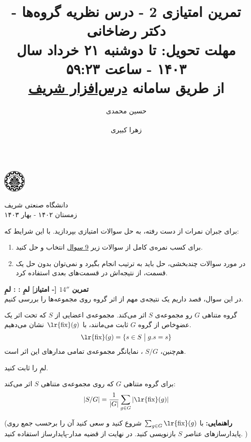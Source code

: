 \documentclass{article}
\title{
	\vspace{-0.8em}
	تمرین امتیازی 2 - درس نظریه گروه‌ها - دکتر رضاخانی
	\\
	{\normalsize
		\textbf{مهلت تحویل:
			تا دوشنبه ۲۱ خرداد سال ۱۴۰۳ - ساعت ۵۹:۲۳
			\\
			\vspace{-0.4em}
			از طریق سامانه
			\href{https://cw.sharif.edu/}{درس‌افزار شریف}
		}
	}
	\vspace{-0.6em}
}
\author{
	حسین محمدی\\
	\lr{
		\href{mailto:hossein.mohammadi.00427@gmail.com}{\texttt{	hossein.mohammadi.00427@gmail.com}}} \\
	\And
	زهرا کبیری\\
	\lr{
		\href{mailto:kabiri.zahra98@gmail.com}{ \texttt{kabiri.zahra98@gmail.com}}}\\
}
\newenvironment{parind}{%
	\par%
	\leftskip=0mm\rightskip=7mm
	\noindent\ignorespaces}{%
	\par}
\newenvironment{exercise}[3][\unskip]{%
	\par
	\noindent
	\textbf{تمرین
		#1
		[- امتیاز] 
		\def\temp{#3}\ifx\temp\empty
		: 
		\else
		: #3 \vspace{0.5em} \\ \noindent
		\fi
}}{}
\begin{document}
	
	
	\begin{minipage}{0.1\textwidth}%
		\includegraphics[width=1.1cm]{sharif-logo.png}
	\end{minipage}%
	\hfill%
	\begin{minipage}{0.9\textwidth}\raggedleft
		دانشگاه صنعتی شریف\\
		زمستان ۱۴۰۲ - بهار ۱۴۰۳\\
	\end{minipage}
	
	\makepertitle
	
	\noindent
	برای جبران نمرات از دست رفته، به حل سوالات امتیازی بپردازید. با این شرایط که:
	\begin{enumerate}
		\item برای کسب نمره‌ی کامل از سوالات زیر \underline{9 سوال}  انتخاب و حل کنید. 
		\item در مورد سوالات چندبخشی، حل باید به ترتیب انجام بگیرد و نمی‌توان بدون حل یک قسمت، از نتیجه‌اش در قسمت‌های بعدی استفاده کرد. 
		
	\end{enumerate}
	
	
	\begin{exercise}[$14''$]{20}{لمِ
		}
		در این سوال، قصد داریم یک نتیجه‌ی مهم از اثر گروه روی مجموعه‌ها  را بررسی کنیم.
		\begin{mdframed}
			گروه متناهی $G$ رو مجموعه‌ی 
			$S$
			اثر می‌کند. مجموعه‌ی اعضایی از $S$ که تحت اثر یک عضوِخاص از گروه $G$ ثابت می‌مانند، با 
			$\text{\lr{fix}}(g)$
			نشان می‌دهیم.
			\[
			\text{\lr{fix}}(g) = \{s\in S \; \big| \; g.s=s\}
			\]
			هم‌چنین، 
			$S/G$
			، نمایانگر مجموعه‌ی تمامی مدارهای این اثر است.
		\end{mdframed}
		لمِ 
		را ثابت کنید.
		\begin{parind}
			برای گروه متناهی $G$ که روی مجموعه‌ی متناهی $S$ اثر می‌کند:
			\[
			|S/G| = \frac{1}{|G|} \sum_{g\in G}|\text{\lr{fix}}(g)|
			\]
		\end{parind}
		
		\noindent
		(\textbf{راهنمایی:}
		با 
		$\sum_{g\in G} \text{\lr{fix}}(g)$
		شروع کنید و سعی کنید آن را برحسب جمع روی پایدارسازهای عناصر 
		$S$ بازنویسی کنید. در نهایت از قضیه مدار-پایدارساز استفاده کنید.
		)
		
	\end{exercise}
	
\end{document}
